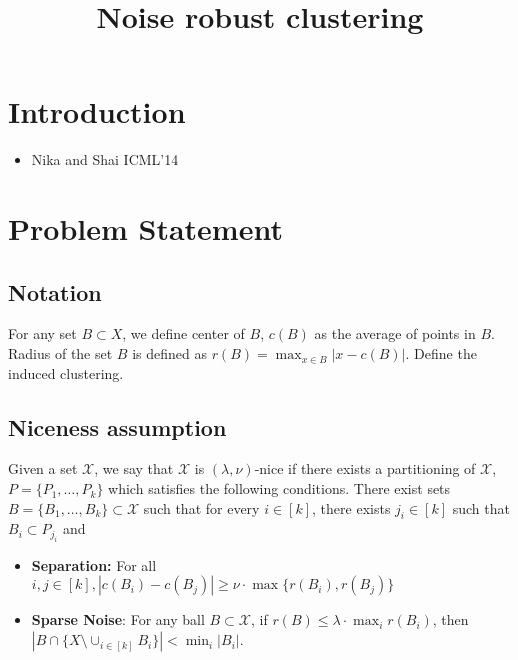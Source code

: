 \documentclass[11pt]{article}
\title{\LARGE Noise robust clustering}
\author{}
\begin{document}
\maketitle

\section{Introduction}
\begin{itemize}
\item Nika and Shai ICML'14
\end{itemize}

\section{Problem Statement}



\subsection{Notation}
For any set $B\subset X$, we define center of $B$, $c(B)$ as the average of points in $B$. Radius of the set $B$ is defined as $r(B)=\max_{x\in B} |x-c(B)|$. Define the induced clustering.


\subsection{Niceness assumption}
\begin{definition}
Given a set $\mathcal{X}$, we say that $\mathcal{X}$ is $(\lambda,\nu)$-nice if there exists a partitioning of $\mathcal{X}$, $P=\{P_1,\ldots,P_k\}$ which satisfies the following conditions. There exist sets $B=\{B_1,\ldots,B_k\}\subset \mathcal{X}$ such that for every $i\in[k]$, there exists $j_i\in[k]$ such that $B_i\subset P_{j_i}$ and
\begin{itemize}
\item{\bf{Separation}:} For all $i,j\in[k], |c(B_i)-c(B_j)|\geq \nu\cdot\max\{r(B_i),r(B_j)\}$
\item{\bf{Sparse Noise}}: For any ball $B\subset \mathcal{X}$, if $r(B)\leq \lambda \cdot \max_i r(B_i)$, then $|B\cap \{X \setminus \cup_{i\in[k]} B_i\}| < \min_i |B_i|$.
\end{itemize}
\end{definition}
\end{document}
